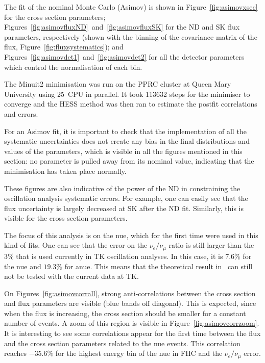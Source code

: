 The fit of the nominal Monte Carlo (\Gls{Asimov}) is shown in
Figure~\ref{fig:asimovxsec} for the cross section parameters;
Figures~\ref{fig:asimovfluxND}~and~\ref{fig:asimovfluxSK} for the
\Gls{ND} and \Gls{SK} flux parameters, respectively (shown with the
binning of the covariance matrix of the flux,
Figure~\ref{fig:fluxsystematics}); and
Figures~\ref{fig:asimovdet1}~and~\ref{fig:asimovdet2} for all the
detector parameters which control the normalisation of each bin.

The Minuit2 minimisation was run on the PPRC cluster at Queen Mary
University using 25~CPU in parallel. It took 113632 steps for the
minimiser to converge and the HESS method was then ran to estimate the
postfit correlations and errors.

For an \Gls{Asimov} fit, it is important to check that the
implementation of all the systematic uncertainties does not create any
bias in the final distributions and values of the parameters, which is
visible in all the figures mentioned in this section: no parameter is
pulled away from its nominal value, indicating that the minimisation
has taken place normally.

These figures are also indicative of the power of the \Gls{ND} in
constraining the oscillation analysis systematic errors. For example,
one can easily see that the flux uncertainty is largely decreased at
\Gls{SK} after the \Gls{ND} fit. Similarly, this is visible for the
cross section parameters.

The focus of this analysis is on the \Gls{nue}, which for the first
time were used in this kind of fits. One can see that the error on the
$\nu_e / \nu_\mu$ ratio is still larger than the $3\%$ that is used
currently in \Gls{TK} oscillation analyses. In this case, it is
$7.6\%$ for the \Gls{nue} and $19.3\%$ for \Gls{anue}. This means that
the theoretical result in~\cite{Day:2012gb} can still not be tested
with the current data at \Gls{TK}.

On Figures~\ref{fig:asimovcorrall}, strong anti-correlations between
the cross section and flux parameters are visible (blue bands off
diagonal). This is expected, since when the flux is increasing, the
cross section should be smaller for a constant number of events. A
zoom of this region is visible in Figure~\ref{fig:asimovcorrzoom}. It
is interesting to see some correlations appear for the first time
between the flux and the cross section parameters related to the
\Gls{nue} events. This correlation reaches $-35.6\%$ for the highest
energy bin of the \Gls{nue} in \Gls{FHC} and the $\nu_e / \nu_\mu$
error.

